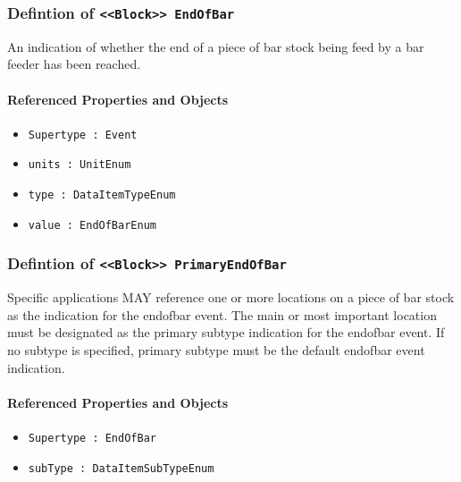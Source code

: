 \subsubsection{Defintion of \texttt{<<Block>> EndOfBar}}
  \label{type:EndOfBar}

\FloatBarrier

An indication of whether the end of a piece of bar stock being feed by a bar feeder has been reached.

\FloatBarrier
\paragraph{Referenced Properties and Objects}

\begin{itemize}
\item \texttt{Supertype : Event}

\item \texttt{units : UnitEnum}

\item \texttt{type : DataItemTypeEnum}

\item \texttt{value : EndOfBarEnum}

\end{itemize}
\FloatBarrier
\subsubsection{Defintion of \texttt{<<Block>> PrimaryEndOfBar}}
  \label{type:PrimaryEndOfBar}

\FloatBarrier

Specific applications MAY reference one or more locations on a piece of bar stock as the indication for the endofbar event. The main or most important location must be designated as the primary subtype indication for the endofbar event.   
 If no subtype is specified, primary subtype must be the default endofbar event indication.

\FloatBarrier
\paragraph{Referenced Properties and Objects}

\begin{itemize}
\item \texttt{Supertype : EndOfBar}

\item \texttt{subType : DataItemSubTypeEnum}

\end{itemize}
\FloatBarrier
